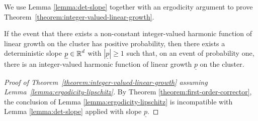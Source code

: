 \documentclass[12pt]{amsart}
\numberwithin{equation}{section}
\begin{document}
	We use Lemma \ref{lemma:det-slope} together with an ergodicity argument to prove Theorem~\ref{theorem:integer-valued-linear-growth}. 
	\begin{lemma} \label{lemma:ergodicity-lipschitz}
		If the event that there exists a non-constant integer-valued harmonic function of linear growth on the cluster 
		has positive probability, then there exists a deterministic slope $\underline{p} \in \operatorname{\mathbb{R}}^d$ with $|\underline{p}| \geq 1$
		such that, on an event of probability one, there is an integer-valued harmonic function
		of linear growth $\underline{p}$ on the cluster. 
	\end{lemma}
	\begin{proof}[Proof of Theorem~\ref{theorem:integer-valued-linear-growth} assuming Lemma~\ref{lemma:ergodicity-lipschitz}]
		By Theorem \ref{theorem:first-order-corrector}, the conclusion of Lemma \ref{lemma:ergodicity-lipschitz} is incompatible with Lemma \ref{lemma:det-slope} applied with slope $\underline{p}$. 
	\end{proof}
\end{document}
